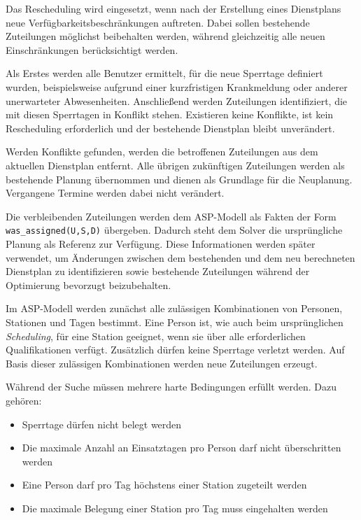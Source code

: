Das Rescheduling wird eingesetzt, wenn nach der Erstellung eines Dienstplans neue Verfügbarkeitsbeschränkungen auftreten. Dabei sollen bestehende Zuteilungen möglichst beibehalten werden, während gleichzeitig alle neuen Einschränkungen berücksichtigt werden.

Als Erstes werden alle Benutzer ermittelt, für die neue Sperrtage definiert wurden, beispielsweise aufgrund einer kurzfristigen Krankmeldung oder anderer unerwarteter Abwesenheiten. Anschließend werden Zuteilungen identifiziert, die mit diesen Sperrtagen in Konflikt stehen. Existieren keine Konflikte, ist kein Rescheduling erforderlich und der bestehende Dienstplan bleibt unverändert.

Werden Konflikte gefunden, werden die betroffenen Zuteilungen aus dem aktuellen Dienstplan entfernt. Alle übrigen zukünftigen Zuteilungen werden als bestehende Planung übernommen und dienen als Grundlage für die Neuplanung. Vergangene Termine werden dabei nicht verändert.

Die verbleibenden Zuteilungen werden dem ASP-Modell als Fakten der Form \texttt{was\_assigned(U,S,D)} übergeben. Dadurch steht dem Solver die ursprüngliche Planung als Referenz zur Verfügung. Diese Informationen werden später verwendet, um Änderungen zwischen dem bestehenden und dem neu berechneten Dienstplan zu identifizieren sowie bestehende Zuteilungen während der Optimierung bevorzugt beizubehalten.

Im ASP-Modell werden zunächst alle zulässigen Kombinationen von Personen, Stationen und Tagen bestimmt. Eine Person ist, wie auch beim ursprünglichen \textit{Scheduling}, für eine Station geeignet, wenn sie über alle erforderlichen Qualifikationen verfügt. Zusätzlich dürfen keine Sperrtage verletzt werden. Auf Basis dieser zulässigen Kombinationen werden neue Zuteilungen erzeugt.

Während der Suche müssen mehrere harte Bedingungen erfüllt werden. Dazu gehören:

\begin{itemize}
\item{Sperrtage dürfen nicht belegt werden}
\item{Die maximale Anzahl an Einsatztagen pro Person darf nicht überschritten werden}
\item{Eine Person darf pro Tag höchstens einer Station zugeteilt werden}
\item{Die maximale Belegung einer Station pro Tag muss eingehalten werden}
\end{itemize}


